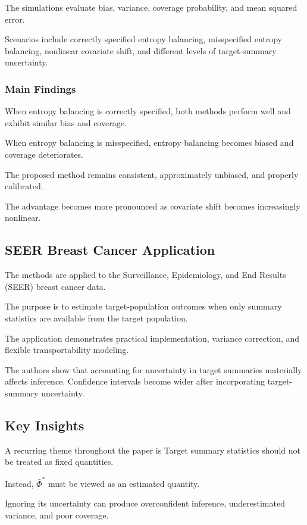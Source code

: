 \documentclass[11pt]{article}
\begin{document}
The simulations evaluate bias, variance, coverage probability, and mean squared error.

Scenarios include correctly specified entropy balancing, misspecified entropy balancing, nonlinear covariate shift, and different levels of target-summary uncertainty.

\subsubsection*{Main Findings}

When entropy balancing is correctly specified, both methods perform well and exhibit similar bias and coverage.

When entropy balancing is misspecified, entropy balancing becomes biased and coverage deteriorates.

The proposed method remains consistent, approximately unbiased, and properly calibrated.

The advantage becomes more pronounced as covariate shift becomes increasingly nonlinear.

\subsection*{SEER Breast Cancer Application}

The methods are applied to the Surveillance, Epidemiology, and End Results (SEER) breast cancer data.

The purpose is to estimate target-population outcomes when only summary statistics are available from the target population.

The application demonstrates practical implementation, variance correction, and flexible transportability modeling.

The authors show that accounting for uncertainty in target summaries materially affects inference. Confidence intervals become wider after incorporating target-summary uncertainty.

\subsection*{Key Insights}

A recurring theme throughout the paper is Target summary statistics should not be treated as fixed quantities.

Instead, $\bar{\Phi}^*$ must be viewed as an estimated quantity.

Ignoring its uncertainty can produce overconfident inference, underestimated variance, and poor coverage.
\end{document}
